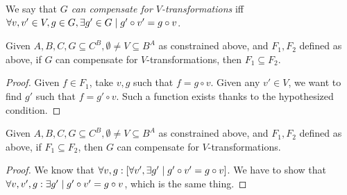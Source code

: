 \documentclass[version=3.21, pagesize, notitlepage, twoside=off, bibliography=totoc, DIV=calc, fontsize=12pt, a4paper]{scrartcl}
\begin{document}
We say that \emph{$G$ can compensate for $V$-transformations} iff $\forall v, v' \in V, g \in G, \exists g' \in G \suchthat g' \circ v' = g \circ v$.%

\begin{lemma}
	Given $A, B, C, G \subseteq C^B, \emptyset ≠ V \subseteq B^A$ as constrained above, and $F_1, F_2$ defined as above, if $G$ can compensate for $V$-transformations, then $F_1 \subseteq F_2$.
\end{lemma}
\begin{proof}
	Given $f \in F_1$, take $v, g$ such that $f = g \circ v$. Given any $v' \in V$, we want to find $g'$ such that $f = g' \circ v$. Such a function exists thanks to the hypothesized condition.
\end{proof}

\begin{lemma}
	Given $A, B, C, G \subseteq C^B, \emptyset ≠ V \subseteq B^A$ as constrained above, and $F_1, F_2$ defined as above, if $F_1 \subseteq F_2$, then $G$ can compensate for $V$-transformations.
\end{lemma}
\begin{proof}
	We know that $\forall v, g: [\forall v', \exists g' \suchthat g' \circ v' = g \circ v]$. We have to show that $\forall v, v', g: \exists g' \suchthat g' \circ v' = g \circ v$, which is the same thing.
\end{proof}
\end{document}
